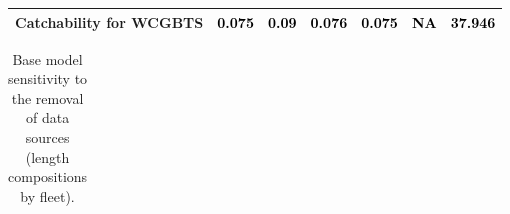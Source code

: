 \documentclass[
]{scrartcl}
\begin{document}
\begin{landscape}
\begin{longtable}[t]{ll>{\raggedright\arraybackslash}p{5em}>{\raggedright\arraybackslash}p{5em}>{\raggedright\arraybackslash}p{5em}>{\raggedright\arraybackslash}p{5em}>{\raggedright\arraybackslash}p{5em}}
\hspace{1em}Catchability for WCGBTS & \textcolor{black}{0.075} & \textcolor{black}{0.09} & \textcolor{black}{0.076} & \textcolor{black}{0.075} & \textcolor{black}{NA} & \textcolor{black}{37.946}\\
\bottomrule

\end{longtable}

\endgroup{}


\end{landscape}

\newpage{}

\begin{landscape}
\begingroup\fontsize{9}{11}\selectfont

\begin{longtable}[t]{ll>{\raggedright\arraybackslash}p{4em}>{\raggedright\arraybackslash}p{4em}>{\raggedright\arraybackslash}p{4em}>{\raggedright\arraybackslash}p{4em}>{\raggedright\arraybackslash}p{4em}>{\raggedright\arraybackslash}p{4em}>{\raggedright\arraybackslash}p{4em}>{\raggedright\arraybackslash}p{4em}}

\caption{\label{tbl-sensitivities-like-lens1}Base model sensitivity to
the removal of data sources (length compositions by fleet).}

\tabularnewline


\end{longtable}
\end{landscape}
\end{document}
